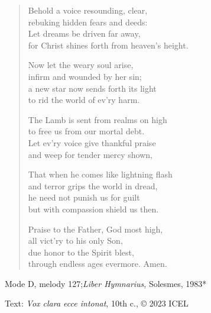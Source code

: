 \hymn

\begin{verse}
Behold a voice resounding, clear,\\
rebuking hidden fears and deeds:\\
Let dreams be driven far away,\\
for Christ shines forth from heaven’s height.

Now let the weary soul arise,\\
infirm and wounded by her sin;\\
a new star now sends forth its light\\
to rid the world of ev’ry harm.

The Lamb is sent from realms on high\\
to free us from our mortal debt.\\
Let ev’ry voice give thankful praise\\
and weep for tender mercy shown,

That when he comes like lightning flash\\
and terror grips the world in dread,\\
he need not punish us for guilt\\
but with compassion shield us then.

Praise to the Father, God most high,\\
all vict’ry to his only Son,\\
due honor to the Spirit blest,\\
through endless ages evermore. Amen.
\end{verse}

\begin{hymnsource}
Mode D, melody 127;\emph{Liber Hymnarius}, Solesmes, 1983*

Text: \emph{Vox clara ecce intonat}, 10th c., © 2023 ICEL
\end{hymnsource}

